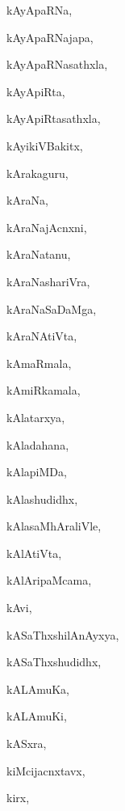 \begin{multicols}{3}
{\noindent
{kAyApaRNa}, \pageref{kAyApaRNa}

\noindent
{kAyApaRNajapa}, \pageref{kAyApaRNajapa}

\noindent
{kAyApaRNasathxla}, \pageref{kAyApaRNasathxla}

\noindent
{kAyApiRta}, \pageref{kAyApiRta}

\noindent
{kAyApiRtasathxla}, \pageref{kAyApiRtasathxla}

\noindent
{kAyikiVBakitx}, \pageref{kAyikiVBakitx}

\noindent
{kArakaguru}, \pageref{kArakaguru}

\noindent
{kAraNa}, \pageref{kAraNa}

\noindent
{kAraNajAcnxni}, \pageref{kAraNajAcnxni}

\noindent
{kAraNatanu}, \pageref{kAraNatanu}

\noindent
{kAraNashariVra}, \pageref{kAraNashariVra}

\noindent
{kAraNaSaDaMga}, \pageref{kAraNaSaDaMga}

\noindent
{kAraNAtiVta}, \pageref{kAraNAtiVta}

\noindent
{kAmaRmala}, \pageref{kAmaRmala}

\noindent
{kAmiRkamala}, \pageref{kAmiRkamala}

\noindent
{kAlatarxya}, \pageref{kAlatarxya}

\noindent
{kAladahana}, \pageref{kAladahana}

\noindent
{kAlapiMDa}, \pageref{kAlapiMDa}

\noindent
{kAlashudidhx}, \pageref{kAlashudidhx}

\noindent
{kAlasaMhAraliVle}, \pageref{kAlasaMhAraliVle}

\noindent
{kAlAtiVta}, \pageref{kAlAtiVta}

\noindent
{kAlAripaMcama}, \pageref{kAlAripaMcama}

\noindent
{kAvi}, \pageref{kAvi}

\noindent
{kASaThxshilAnAyxya}, \pageref{kASaThxshilAnAyxya}

\noindent
{kASaThxshudidhx}, \pageref{kASaThxshudidhx}

\noindent
{kALAmuKa}, \pageref{kALAmuKa}

\noindent
{kALAmuKi}, \pageref{kALAmuKi}

\noindent
{kASxra}, \pageref{kASxra}

\noindent
{kiMcijacnxtavx}, \pageref{kiMcijacnxtavx}

\noindent
{kirx}, \pageref{kirx}

}
\end{multicols}
